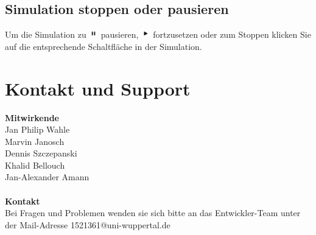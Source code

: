 \documentclass[11pt,a4paper]{article}
\begin{document}
\subsection{Simulation stoppen oder pausieren}
Um die Simulation zu \includegraphics[height=11pt]{icon/pause} pausieren, \includegraphics[height=11pt]{icon/resume_play} fortzusetzen oder zum Stoppen klicken Sie auf die entsprechende Schaltfläche in der Simulation.
\newpage
\section{Kontakt und Support}
\textbf{Mitwirkende} \\ 
Jan Philip Wahle \\
Marvin Janosch \\
Dennis Szczepanski \\
Khalid Bellouch \\
Jan-Alexander Amann \\
\\
\textbf{Kontakt} \\ 
Bei Fragen und Problemen wenden sie sich bitte an das Entwickler-Team unter der Mail-Adresse 1521361@uni-wuppertal.de
\end{document}
